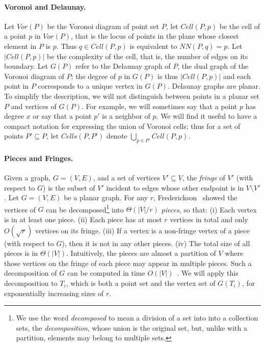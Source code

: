 \documentclass[10pt,a4paper]{amsart}
\newcommand{\Cell}{\mathit{Cell}}
\newcommand{\Cells}{\mathit{Cells}}
\newcommand{\NN}{\mathit{NN}}
\newcommand{\Voron}{\mathit{Vor}}
\begin{document}
\paragraph*{Voronoi and Delaunay.}
Let $\Voron(P)$ be the Voronoi diagram of point set $P$, let $\Cell(P,p)$ be the cell of a point $p$ in $\Voron(P)$, that is the locus of points in the plane whose closest element in $P$ is $p$. Thus $q\in \Cell(P,p)$ is equivalent to $\NN(P,q)=p$.
Let $|\Cell(P,p)|$ be the complexity of the cell, that is, the number of edges on its boundary.
Let $G(P)$ refer to the Delaunay graph of $P$, the dual graph of the Voronoi diagram of $P$; the degree of $p$ in $G(P)$ is thus $|\Cell(P,p)|$ and each point in $P$ corresponds to a unique vertex in $G(P)$.  Delaunay graphs are planar.  To simplify the description, we will not distinguish between points in a planar set $P$ and vertices of $G(P)$. For example, we will sometimes say that a point $p$ has degree $x$ or say that a point $p'$ is a neighbor of $p$. We will find it useful to have a compact notation for expressing the union of Voronoi cells; thus for a set of points $P' \subseteq P$, let $\Cells(P,P')$ denote $ \bigcup_{p \in P'} \Cell(P,p)$.

\paragraph*{Pieces and Fringes.}
Given a graph, $G=(V,E)$, and a set of vertices $V' \subseteq V$, the \emph{fringe} of $V'$ (with respect to $G$) is the subset of $V'$ incident to edges whose other endpoint is in $V \setminus V'$.
Let $G=(V,E)$ be a planar graph. For any $r$, Frederickson~\cite{Frederickson87} showed the vertices of $G$ can be decomposed\footnote{We use the word \emph{decomposed} to mean a division of a set into into a collection sets, the \emph{decomposition}, whose union is the original set, but, unlike with a partition, elements may belong to multiple sets.} into $\Theta(|V|/r)$ \emph{pieces}, so that:  (i) Each vertex is in at least one piece. (ii) Each piece has at most $r$ vertices in total and  only  $O(\sqrt{r})$ vertices on its fringe. (iii) If a vertex is a non-fringe vertex of a piece (with respect to $G$), then it is not in any other pieces. (iv) The total size of all pieces is in $\Theta(|V|)$.   Intuitively, the pieces are almost a partition of $V$ where those vertices on the fringe of each piece may appear in multiple pieces.
Such a decomposition of $G$ can be computed in time $O(|V|)$~\cite{Goodrich95,KleinMS13}. 
We will apply this decomposition to  $T_i$, which is both a point set and the vertex set of $G(T_i)$, for exponentially increasing sizes of $r$.
\end{document}
